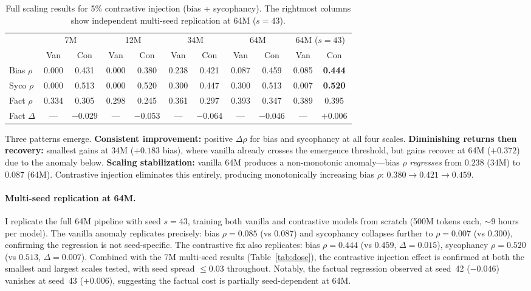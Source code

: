 \documentclass[11pt]{article}
\begin{document}
\begin{table}[t]
\centering
\caption{Full scaling results for 5\% contrastive injection (bias + sycophancy). The rightmost columns show independent multi-seed replication at 64M ($s{=}43$).}
\label{tab:scaling}
\begin{tabular}{lcccccccccc}
\toprule
 & \multicolumn{2}{c}{7M} & \multicolumn{2}{c}{12M} & \multicolumn{2}{c}{34M} & \multicolumn{2}{c}{64M} & \multicolumn{2}{c}{64M ($s{=}43$)} \\
\cmidrule(lr){2-3}\cmidrule(lr){4-5}\cmidrule(lr){6-7}\cmidrule(lr){8-9}\cmidrule(lr){10-11}
 & Van & Con & Van & Con & Van & Con & Van & Con & Van & Con \\
\midrule
Bias $\rho$  & 0.000 & 0.431 & 0.000 & 0.380 & 0.238 & 0.421 & 0.087 & 0.459 & 0.085 & \textbf{0.444} \\
Syco $\rho$  & 0.000 & 0.513 & 0.000 & 0.520 & 0.300 & 0.447 & 0.300 & 0.513 & 0.007 & \textbf{0.520} \\
Fact $\rho$  & 0.334 & 0.305 & 0.298 & 0.245 & 0.361 & 0.297 & 0.393 & 0.347 & 0.389 & 0.395 \\
Fact $\Delta$ & --- & $-$0.029 & --- & $-$0.053 & --- & $-$0.064 & --- & $-$0.046 & --- & $+$0.006 \\
\bottomrule
\end{tabular}
\end{table}

Three patterns emerge. \textbf{Consistent improvement:} positive $\Delta\rho$ for bias and sycophancy at all four scales. \textbf{Diminishing returns then recovery:} smallest gains at 34M ($+0.183$ bias), where vanilla already crosses the emergence threshold, but gains recover at 64M ($+0.372$) due to the anomaly below. \textbf{Scaling stabilization:} vanilla 64M produces a non-monotonic anomaly---bias $\rho$ \emph{regresses} from $0.238$ (34M) to $0.087$ (64M). Contrastive injection eliminates this entirely, producing monotonically increasing bias $\rho$: $0.380 \to 0.421 \to 0.459$.

\paragraph{Multi-seed replication at 64M.} I replicate the full 64M pipeline with seed $s = 43$, training both vanilla and contrastive models from scratch (500M tokens each, ${\sim}9$ hours per model). The vanilla anomaly replicates precisely: bias $\rho = 0.085$ (vs $0.087$) and sycophancy collapses further to $\rho = 0.007$ (vs $0.300$), confirming the regression is not seed-specific. The contrastive fix also replicates: bias $\rho = 0.444$ (vs $0.459$, $\Delta = 0.015$), sycophancy $\rho = 0.520$ (vs $0.513$, $\Delta = 0.007$). Combined with the 7M multi-seed results (Table~\ref{tab:dose}), the contrastive injection effect is confirmed at both the smallest and largest scales tested, with seed spread $\leq 0.03$ throughout. Notably, the factual regression observed at seed~42 ($-0.046$) vanishes at seed~43 ($+0.006$), suggesting the factual cost is partially seed-dependent at 64M.
\end{document}

